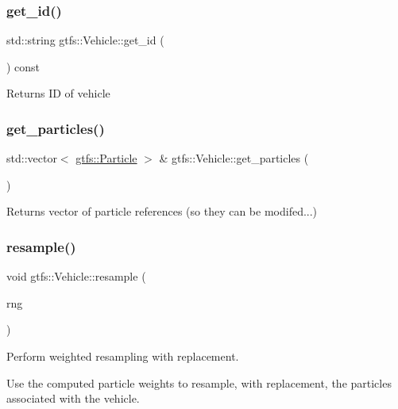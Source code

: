 \subsubsection{\texorpdfstring{get\+\_\+id()}{get\_id()}}
{\footnotesize\ttfamily std\+::string gtfs\+::\+Vehicle\+::get\+\_\+id (\begin{DoxyParamCaption}{ }\end{DoxyParamCaption}) const}

\begin{DoxyReturn}{Returns}
ID of vehicle 
\end{DoxyReturn}
\mbox{\label{classgtfs_1_1Vehicle_a7b12b079c68880f00f532ca25858c368}} 
\subsubsection{\texorpdfstring{get\+\_\+particles()}{get\_particles()}}
{\footnotesize\ttfamily std\+::vector$<$ \hyperlink{classgtfs_1_1Particle}{gtfs\+::\+Particle} $>$ \& gtfs\+::\+Vehicle\+::get\+\_\+particles (\begin{DoxyParamCaption}{ }\end{DoxyParamCaption})}

\begin{DoxyReturn}{Returns}
vector of particle references (so they can be modifed...) 
\end{DoxyReturn}
\mbox{\label{classgtfs_1_1Vehicle_a8367fc70a64b7e596422f880dbff1193}} 
\subsubsection{\texorpdfstring{resample()}{resample()}}
{\footnotesize\ttfamily void gtfs\+::\+Vehicle\+::resample (\begin{DoxyParamCaption}\item[{\hyperlink{classsampling_1_1RNG}{sampling\+::\+R\+NG} \&}]{rng }\end{DoxyParamCaption})}

Perform weighted resampling with replacement.

Use the computed particle weights to resample, with replacement, the particles associated with the vehicle. \mbox{\label{classgtfs_1_1Vehicle_a50ae70c92d958437a2196b0ce81acff0}} 
